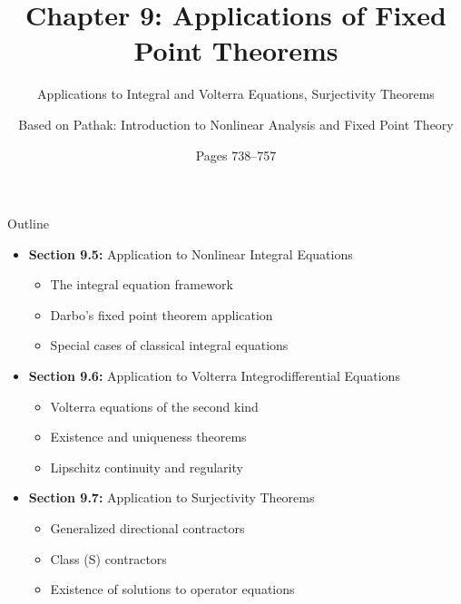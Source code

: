 \documentclass[aspectratio=169,10pt]{beamer}
\title{Chapter 9: Applications of Fixed Point Theorems}
\subtitle{Applications to Integral and Volterra Equations, Surjectivity Theorems}
\author{Based on Pathak: Introduction to Nonlinear Analysis and Fixed Point Theory}
\date{Pages 738--757}
\begin{document}
\begin{frame}
\titlepage
\end{frame}

\begin{frame}[allowframebreaks]{Outline}
\begin{itemize}
    \item \textbf{Section 9.5:} Application to Nonlinear Integral Equations
    \begin{itemize}
        \item The integral equation framework
        \item Darbo's fixed point theorem application
        \item Special cases of classical integral equations
    \end{itemize}
    \vspace{0.3cm}
    \item \textbf{Section 9.6:} Application to Volterra Integrodifferential Equations
    \begin{itemize}
        \item Volterra equations of the second kind
        \item Existence and uniqueness theorems
        \item Lipschitz continuity and regularity
    \end{itemize}
    \vspace{0.3cm}
    \item \textbf{Section 9.7:} Application to Surjectivity Theorems
    \begin{itemize}
        \item Generalized directional contractors
        \item Class (S) contractors
        \item Existence of solutions to operator equations
    \end{itemize}
\end{itemize}
\end{frame}

\end{document}
